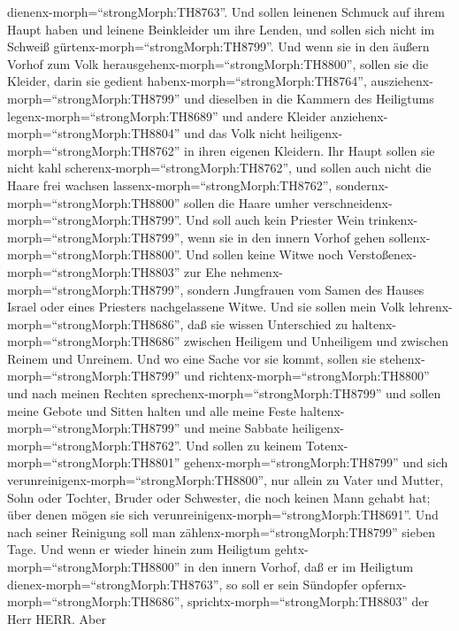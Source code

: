 dienenx-morph=``strongMorph:TH8763''.  Und sollen leinenen
Schmuck auf ihrem Haupt haben und leinene Beinkleider um ihre Lenden,
und sollen sich nicht im Schweiß gürtenx-morph=``strongMorph:TH8799''.
 Und wenn sie in den äußern Vorhof zum Volk
herausgehenx-morph=``strongMorph:TH8800'', sollen sie die Kleider, darin
sie gedient habenx-morph=``strongMorph:TH8764'',
ausziehenx-morph=``strongMorph:TH8799'' und dieselben in die Kammern des
Heiligtums legenx-morph=``strongMorph:TH8689'' und andere Kleider
anziehenx-morph=``strongMorph:TH8804'' und das Volk nicht
heiligenx-morph=``strongMorph:TH8762'' in ihren eigenen Kleidern.
 Ihr Haupt sollen sie nicht kahl
scherenx-morph=``strongMorph:TH8762'', und sollen auch nicht die Haare
frei wachsen lassenx-morph=``strongMorph:TH8762'',
sondernx-morph=``strongMorph:TH8800'' sollen die Haare umher
verschneidenx-morph=``strongMorph:TH8799''.  Und soll auch
kein Priester Wein trinkenx-morph=``strongMorph:TH8799'', wenn sie in
den innern Vorhof gehen sollenx-morph=``strongMorph:TH8800''.
 Und sollen keine Witwe noch
Verstoßenex-morph=``strongMorph:TH8803'' zur Ehe
nehmenx-morph=``strongMorph:TH8799'', sondern Jungfrauen vom Samen des
Hauses Israel oder eines Priesters nachgelassene Witwe. 
Und sie sollen mein Volk lehrenx-morph=``strongMorph:TH8686'', daß sie
wissen Unterschied zu haltenx-morph=``strongMorph:TH8686'' zwischen
Heiligem und Unheiligem und zwischen Reinem und Unreinem. 
Und wo eine Sache vor sie kommt, sollen sie
stehenx-morph=``strongMorph:TH8799'' und
richtenx-morph=``strongMorph:TH8800'' und nach meinen Rechten
sprechenx-morph=``strongMorph:TH8799'' und sollen meine Gebote und
Sitten halten und alle meine Feste haltenx-morph=``strongMorph:TH8799''
und meine Sabbate heiligenx-morph=``strongMorph:TH8762''. 
Und sollen zu keinem Totenx-morph=``strongMorph:TH8801''
gehenx-morph=``strongMorph:TH8799'' und sich
verunreinigenx-morph=``strongMorph:TH8800'', nur allein zu Vater und
Mutter, Sohn oder Tochter, Bruder oder Schwester, die noch keinen Mann
gehabt hat; über denen mögen sie sich
verunreinigenx-morph=``strongMorph:TH8691''.  Und nach
seiner Reinigung soll man zählenx-morph=``strongMorph:TH8799'' sieben
Tage.  Und wenn er wieder hinein zum Heiligtum
gehtx-morph=``strongMorph:TH8800'' in den innern Vorhof, daß er im
Heiligtum dienex-morph=``strongMorph:TH8763'', so soll er sein Sündopfer
opfernx-morph=``strongMorph:TH8686'',
sprichtx-morph=``strongMorph:TH8803'' der Herr HERR.  Aber
